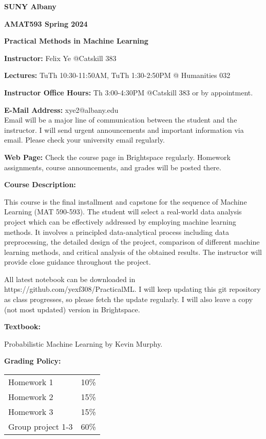 \documentclass[a4paper,10pt]{article}
\begin{document}
\begin{center}

\textbf{SUNY Albany}

\textbf{AMAT593 Spring 2024}

\textbf{Practical Methods in Machine Learning}


\end{center}

\textbf{Instructor:} Felix Ye @Catskill 383 

\textbf{Lectures:} TuTh 10:30-11:50AM, TuTh 1:30-2:50PM @ Humanities 032

\textbf{Instructor Office Hours:}   Th 3:00-4:30PM  @Catskill 383 or by appointment. 


\textbf{E-Mail Address:} xye2@albany.edu\\
Email will be a major line of communication between the student and the instructor. I will send urgent announcements and important information via email. Please check your university email regularly.

\textbf{Web Page:}
Check the course page in Brightspace regularly. Homework assignments, course announcements, and grades will be posted there.


\textbf{Course Description:} 	
	
	
This course is the final installment and capstone for the sequence of Machine Learning (MAT 590-593).  The student will select a real-world data analysis project which can be effectively addressed by employing machine learning methods.  It involves a principled data-analytical process including data preprocessing, the detailed design of the project, comparison of different machine learning methods, and critical analysis of the obtained results.  The instructor will provide close guidance throughout the project. 

All latest notebook can be downloaded in https://github.com/yexf308/PracticalML. I will keep updating this git repository as class progresses, so please fetch the update regularly. I will also leave a copy (not most updated) version in Brightspace. 
 

\textbf{Textbook:} 

Probabilistic Machine Learning by Kevin Murphy.

\textbf{Grading Policy:}

\begin{tabular}{lr}
Homework 1 & 10\%\\
Homework 2 & 15\%\\
Homework 3 & 15\%\\
Group project 1-3 & 60\% \\ 
\end{tabular}
\end{document}

